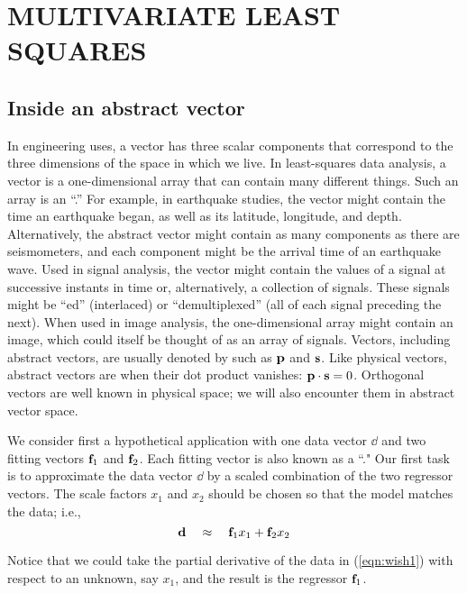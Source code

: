 %	
	
	
	
\section{MULTIVARIATE LEAST SQUARES}

\subsection{Inside an abstract vector}
In engineering uses,
a vector has three scalar components that
correspond to the three dimensions of the space in which we live.
In least-squares data analysis, a vector is a one-dimensional array
that can contain many different things.
Such an array is an ``.''
For example, in earthquake studies,
the vector might contain the time
an earthquake began, as well as its latitude, longitude, and depth.
Alternatively, the abstract vector
might contain as many components as there are seismometers,
and each component might be the arrival time of an earthquake wave.
Used in signal analysis,
the vector might contain the values of a signal
at successive instants in time or,
alternatively, a collection of signals.
These signals might be ``ed'' (interlaced)
or ``demultiplexed'' (all of each signal preceding the next).
When used in image analysis,
the one-dimensional array might contain an image,
which could itself be thought of as an array of signals.
Vectors, including abstract vectors,
are usually denoted by  such as $\bold p$ and $\bold s$.
Like physical vectors,
abstract vectors are 
when their dot product vanishes: $\bold p \cdot \bold s =0$.
Orthogonal vectors are well known in physical space;
we will also encounter them in abstract vector space.

\par
We consider first a hypothetical application
with one data vector $\dd$ and two
fitting vectors $\bold f_1$ and $\bold f_2$.
Each fitting vector is also known as a ``."
Our first task is to approximate the data vector $\dd$
by a scaled combination of the two regressor vectors.
The scale factors $x_1$ and $x_2$
should be chosen so that the model matches the data; i.e.,
\begin{equation}
        {\bf d}  \quad \approx \quad \bold f_1 x_1 + \bold f_2 x_2
        \label{eqn:wish1}
\end{equation}
\par
Notice that we could take the partial derivative
of the data in (\ref{eqn:wish1}) with respect to an unknown,
say $x_1$,
and the result is the regressor $\bold f_1$.
\par
{}

